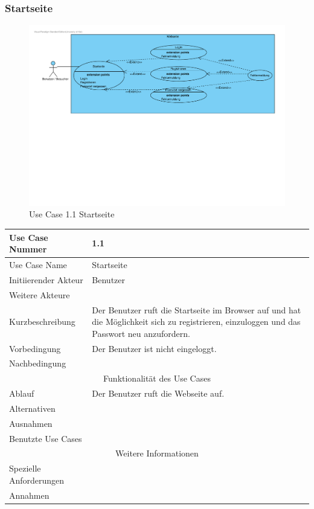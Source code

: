 \documentclass[10pt,a4paper]{article}
\begin{document}
\subsubsection{Startseite}
	\begin{figure}[h!]
	  \includegraphics[width=\linewidth]{gfx/webseite/startseite.pdf}
          \caption{Use Case 1.1 Startseite}
	\end{figure}
	\begin{tabular}{|l|p{.5\linewidth}|}
	\hline Use Case Nummer & 1.1 \\ 
	\hline Use Case Name & Startseite \\ 
	\hline Initiierender Akteur & Benutzer \\
	\hline Weitere Akteure &  \\
	\hline Kurzbeschreibung & Der Benutzer ruft die Startseite im Browser auf und hat die M\"oglichkeit sich zu registrieren, einzuloggen und das Passwort neu anzufordern. \\
	\hline Vorbedingung & Der Benutzer ist nicht eingeloggt. \\
	\hline Nachbedingung &  \\
	\hline \multicolumn{2}{|c|}{Funktionalität des Use Cases}\\
	\hline Ablauf & Der Benutzer ruft die Webseite auf. \\
	\hline Alternativen &  \\
	\hline Ausnahmen &  \\
	\hline Benutzte Use Cases &  \\
	\hline \multicolumn{2}{|c|}{Weitere Informationen} \\
	\hline Spezielle Anforderungen &  \\
	\hline Annahmen &  \\
	\hline
	\end{tabular} 
\end{document}
